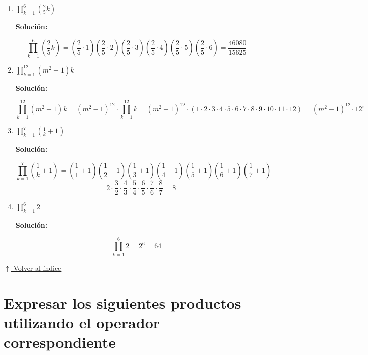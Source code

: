 \documentclass[12pt]{article}
\newcommand{\solucion}{%
    \vspace{0.8em}%
    \textbf{Solución:}%
}
\newcommand{\volverindice}{%
    \vspace{1em}%
    \begin{flushright}%
        \hyperlink{indice}{\small $\uparrow$ Volver al índice}%
    \end{flushright}%
}
\begin{document}
\begin{enumerate}[label=\alph*.-]
    \item $\displaystyle\prod_{k=1}^{6}\left(\frac{2}{5}k\right)$

    \solucion
    \[
    \prod_{k=1}^{6}\left(\frac{2}{5}k\right)
    = \left(\frac{2}{5}\cdot1\right)\left(\frac{2}{5}\cdot2\right)\left(\frac{2}{5}\cdot3\right)
      \left(\frac{2}{5}\cdot4\right)\left(\frac{2}{5}\cdot5\right)\left(\frac{2}{5}\cdot6\right)
    = \frac{46080}{15625}
    \]

    \item $\displaystyle\prod_{k=1}^{12}(m^2-1)k$

    \solucion
    \[
    \prod_{k=1}^{12}(m^2-1)k = (m^2-1)^{12}\cdot\prod_{k=1}^{12}k
    = (m^2-1)^{12}\cdot(1\cdot2\cdot3\cdot4\cdot5\cdot6\cdot7\cdot8\cdot9\cdot10\cdot11\cdot12)
    = (m^2-1)^{12}\cdot 12!
    \]

    \item $\displaystyle\prod_{k=1}^{7}\left(\frac{1}{k}+1\right)$

    \solucion
    \[
    \prod_{k=1}^{7}\left(\frac{1}{k}+1\right)
    = \left(\frac{1}{1}+1\right)\left(\frac{1}{2}+1\right)\left(\frac{1}{3}+1\right)
      \left(\frac{1}{4}+1\right)\left(\frac{1}{5}+1\right)\left(\frac{1}{6}+1\right)\left(\frac{1}{7}+1\right)
    \]
    \[
    = 2\cdot\frac{3}{2}\cdot\frac{4}{3}\cdot\frac{5}{4}\cdot\frac{6}{5}\cdot\frac{7}{6}\cdot\frac{8}{7} = 8
    \]

    \item $\displaystyle\prod_{k=1}^{6}2$

    \solucion
    \[
    \prod_{k=1}^{6}2 = 2^6 = 64
    \]

\end{enumerate}

\volverindice
\newpage

\section{Expresar los siguientes productos utilizando el operador correspondiente}
\end{document}
